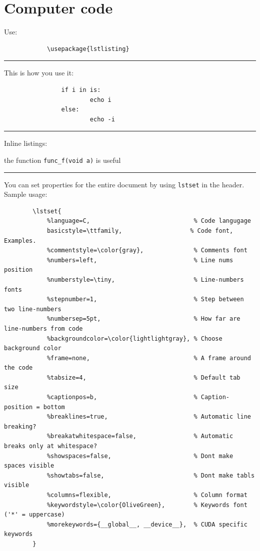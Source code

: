 \documentclass[12pt]{article}
\newcommand{\inOut}[1]{#1}                                %
\begin{document}
\section{Computer code}\label{code}

    \begin{remark} \label{remCode1}
        Use:
        \begin{lstlisting}
            \usepackage{lstlisting}
        \end{lstlisting}
    \end{remark}\hrule

    \begin{example} \label{expLst1}
        This is how you use it:
            \begin{lstlisting}
                if i in is:
                        echo i
                else:
                        echo -i
            \end{lstlisting}
    \end{example}\hrule

    \begin{example} \label{expLst2}
        Inline listings:

            the function \lstinline|func_f(void a)| is useful
    \end{example}\hrule

    You can set properties for the entire document by using \lstinline|lstset| in the header.
    Sample usage:

    \begin{lstlisting}
        \lstset{
            %language=C,                             % Code langugage
            basicstyle=\ttfamily,                   % Code font, Examples.
            %commentstyle=\color{gray},              % Comments font
            %numbers=left,                           % Line nums position
            %numberstyle=\tiny,                      % Line-numbers fonts
            %stepnumber=1,                           % Step between two line-numbers
            %numbersep=5pt,                          % How far are line-numbers from code
            %backgroundcolor=\color{lightlightgray}, % Choose background color
            %frame=none,                             % A frame around the code
            %tabsize=4,                              % Default tab size
            %captionpos=b,                           % Caption-position = bottom
            %breaklines=true,                        % Automatic line breaking?
            %breakatwhitespace=false,                % Automatic breaks only at whitespace?
            %showspaces=false,                       % Dont make spaces visible
            %showtabs=false,                         % Dont make tabls visible
            %columns=flexible,                       % Column format
            %keywordstyle=\color{OliveGreen},        % Keywords font ('*' = uppercase)
            %morekeywords={__global__, __device__},  % CUDA specific keywords
        }
    \end{lstlisting}
\end{document}
